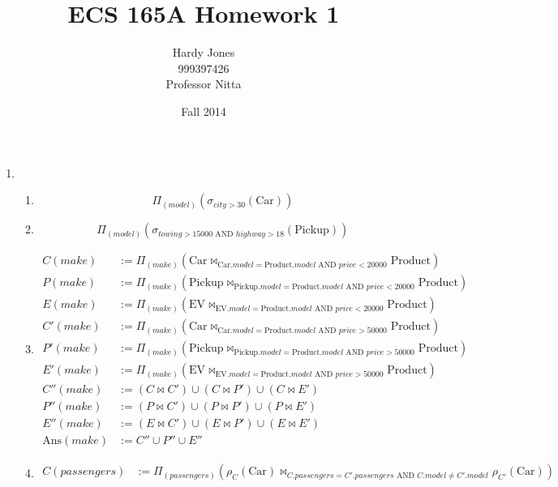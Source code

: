 \documentclass[12pt,letterpaper]{article}
\title{ECS 165A Homework 1\vspace{-2ex}}
\author{Hardy Jones\\
        999397426\\
        Professor Nitta\vspace{-2ex}}
\date{Fall 2014}
\newcommand{\parens}[1]{\left(#1\right)}
\newcommand{\Ans}[0]{\text{Ans}}
\newcommand{\Car}[0]{\text{Car}}
\newcommand{\EV}[0]{\text{EV}}
\newcommand{\Pickup}[0]{\text{Pickup}}
\newcommand{\Product}[0]{\text{Product}}
\newcommand{\AND}[0]{\text{ AND }}
\begin{document}
  \maketitle

  \begin{enumerate}
    \item
      \begin{enumerate}
        \item \[\Pi_{\parens{model}}\parens{\sigma_{city > 30}\parens{\Car}}\]
        \item \[\Pi_{\parens{model}}\parens{\sigma_{towing > 15000 \AND highway > 18}\parens{\Pickup}}\]
        \item
          \begin{align*}
            C(make)  &:= \Pi_{\parens{make}}\parens{\Car \bowtie_{\Car.model = \Product.model \AND price < 20000} \Product} \\
            P(make)  &:= \Pi_{\parens{make}}\parens{\Pickup \bowtie_{\Pickup.model = \Product.model \AND price < 20000} \Product} \\
            E(make)  &:= \Pi_{\parens{make}}\parens{\EV \bowtie_{\EV.model = \Product.model \AND price < 20000} \Product} \\
            C'(make) &:= \Pi_{\parens{make}}\parens{\Car \bowtie_{\Car.model = \Product.model \AND price > 50000} \Product} \\
            P'(make) &:= \Pi_{\parens{make}}\parens{\Pickup \bowtie_{\Pickup.model = \Product.model \AND price > 50000} \Product} \\
            E'(make) &:= \Pi_{\parens{make}}\parens{\EV \bowtie_{\EV.model = \Product.model \AND price > 50000} \Product} \\
            C''(make) &:= \parens{C \bowtie C'} \cup \parens{C \bowtie P'} \cup \parens{C \bowtie E'} \\
            P''(make) &:= \parens{P \bowtie C'} \cup \parens{P \bowtie P'} \cup \parens{P \bowtie E'} \\
            E''(make) &:= \parens{E \bowtie C'} \cup \parens{E \bowtie P'} \cup \parens{E \bowtie E'} \\
            \Ans(make) &:= C'' \cup P'' \cup E''
          \end{align*}
        \item
          \begin{align*}
            C(passengers) &:= \Pi_{\parens{passengers}}\parens{\rho_C\parens{\Car} \bowtie_{C.passengers = C'.passengers \AND C.model \ne C'.model} \rho_{C'}\parens{\Car}} \\

\end{align*}
\end{enumerate}
\end{enumerate}
\end{document}
